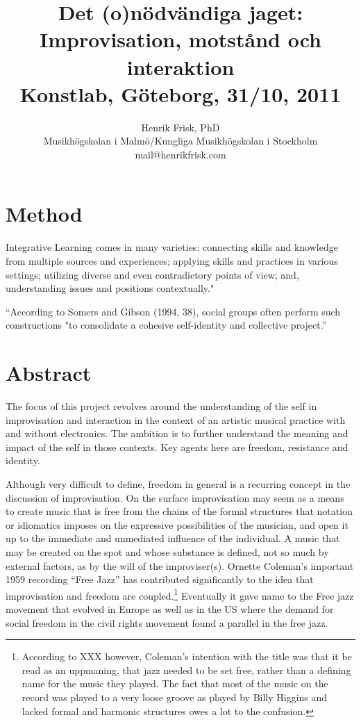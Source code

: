 \documentclass[a4paper]{article}
\title{Det (o)nödvändiga jaget: Improvisation, motstånd och interaktion\\\vspace{.6cm}
\large{Konstlab, Göteborg, 31/10, 2011}}
\author{Henrik Frisk, PhD\\{\small Musikhögskolan i Malmö/Kungliga Musikhögskolan i Stockholm}\\{\small mail@henrikfrisk.com}}
\date{}
\begin{document}
\maketitle

\thispagestyle{empty}


\noindent

\section{Method}
\label{sec:method}

Integrative Learning comes in many varieties: connecting skills and knowledge from multiple sources and experiences; applying skills and practices in various settings; utilizing diverse and even contradictory points of view; and, understanding issues and positions contextually."


``According to Somers and Gibson (1994, 38), social groups often perform such constructions "to consolidate a cohesive self-identity and collective project.'' \citep[p. 103]{lewis-1}

\section{Abstract}

The focus of this project revolves around the understanding of the self in improvisation and interaction in the context of an artistic musical practice with and without electronics. The ambition is to further understand the meaning and impact of the self in those contexts. Key agents here are freedom, resistance and identity. 

Although very difficult to define, freedom in general is a recurring concept in the discussion of improvisation. On the surface improvisation may seem as a means to create music that is free from the chains of the formal structures that notation or idiomatics imposes on the expressive possibilities of the musician, and open it up to the immediate and unmediated influence of the individual. A music that may be created on the spot and whose substance is defined, not so much by external factors, as by the will of the improviser(s). Ornette Coleman's important 1959 recording ``Free Jazz'' has contributed significantly to the idea that improvisation and freedom are coupled.\footnote{According to XXX however, Coleman's intention with the title was that it be read as an uppmaning, that jazz needed to be set free, rather than a defining name for the music they played. The fact that most of the music on the record was played to a very loose groove as played by Billy Higgins and lacked formal and harmonic structures owes a lot to the confusion.} Eventually it gave name to the Free jazz movement that evolved in Europe as well as in the US where the demand for social freedom in the civil rights movement found a parallel in the free jazz.
\end{document}
